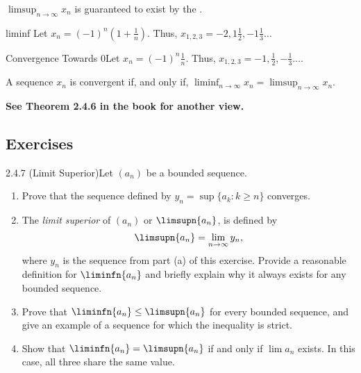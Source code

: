 \(\limsup_{n \to \infty} x_n\) is guaranteed to exist by the .

\begin{example}
    {liminf} Let \(x_n = (-1)^n(1 + \frac{1}{n})\). Thus, \(x_{1,2,3} = -2,1\frac{1}{2},-1\frac{1}{3}\dots\)
\end{example}

\begin{example}
    {Convergence Towards 0}Let \(x_n = (-1)^n\frac{1}{n}\). Thus, \(x_{1,2,3} = -1, \frac{1}{2}, -\frac{1}{3}\dots\).
\end{example}

\begin{theorem}
    A sequence \(x_n\) is convergent if, and only if, \(\liminf_{n \to \infty} x_n = \limsup_{n \to \infty} x_n\).
\end{theorem}

\textbf{See Theorem 2.4.6 in the book for another view.}


\renewcommand{\theenumi}{\alph{enumi}}
\renewcommand{\labelenumi}{(\theenumi)}
\subsection{Exercises}

\begin{exercise}
    {2.4.7 (Limit Superior)}Let \((a_{n})\) be a bounded sequence.
    \begin{enumerate}
        \item Prove that the sequence defined by \(y_{n} = \sup\{a_{k} \colon k \geq n\}\) converges.
        \item The \textit{limit superior} of \((a_{n})\) or \(\limsupn{a_{n}}\), is defined by \[
                  \limsupn{a_{n}} = \lim_{n \rightarrow \infty} y_{n},
              \]
              where \(y_{n}\) is the sequence from part (a) of this exercise. Provide a reasonable definition for \(\liminfn{a_{n}}\) and briefly explain why it always exists for any bounded sequence.
        \item Prove that \(\liminfn{a_{n}} \leq \limsupn{a_{n}}\) for every bounded sequence, and give an example of a sequence for which the inequality is strict.
        \item Show that \(\liminfn{a_{n}} = \limsupn{a_{n}}\) if and only if \(\lim a_{n}\) exists. In this case, all three share the same value.
    \end{enumerate}
\end{exercise}

